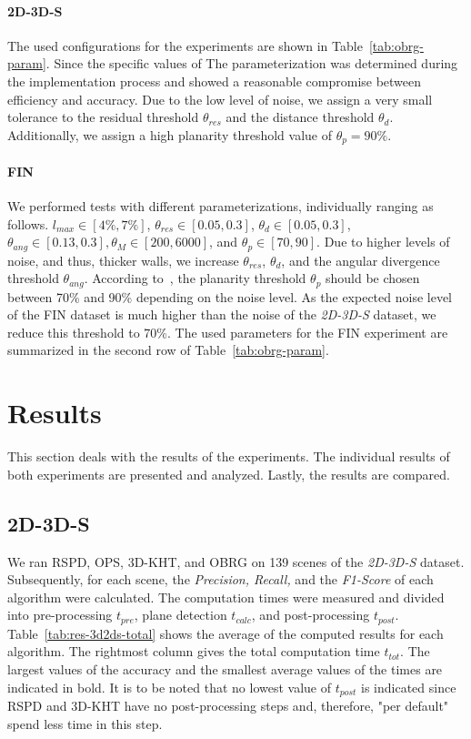 \documentclass[main.tex]{subfiles}
\begin{document}
\paragraph{2D-3D-S}
The used configurations for the experiments are shown in Table~\ref{tab:obrg-param}.
Since the specific values of 
The parameterization was determined during the implementation process and showed a reasonable compromise between
efficiency and accuracy.
Due to the low level of noise, we assign a very small tolerance to the residual threshold $\theta_{res}$ and the distance threshold $\theta_d$.
Additionally, we assign a high planarity threshold value of $\theta_p = 90\%$.

\paragraph{FIN}
We performed tests with different parameterizations, individually ranging as follows.
$l_{max} \in [4\%, 7\%]$, $\theta_{res} \in [0.05, 0.3]$, $\theta_d \in [0.05, 0.3]$, $\theta_{ang}\in[0.13, 0.3], \theta_M \in [200, 6000]$,
and $\theta_p\in[70, 90]$.
Due to higher levels of noise, and thus, thicker walls, we increase $\theta_{res}$, $\theta_d$, and the angular divergence threshold $\theta_{ang}$.
According to~\cite[Section~3.4]{Vo_Truong-Hong_Laefer_Bertolotto_2015},
the planarity threshold $\theta_p$ should be chosen between 70\% and 90\% depending on the noise level. As the expected noise level of the
FIN dataset is much higher than the noise of the \textit{2D-3D-S} dataset, we reduce this threshold to 70\%.
The used parameters for the FIN experiment are summarized in the second row of Table~\ref{tab:obrg-param}.


\section{Results}
This section deals with the results of the experiments.
The individual results of both experiments are presented and analyzed. Lastly, the results are compared.


\subsection{2D-3D-S}

We ran RSPD, OPS, 3D-KHT, and OBRG on 139 scenes of the \textit{2D-3D-S} dataset. Subsequently, for each scene, the \textit{Precision, Recall,} and
the \textit{F1-Score} of each algorithm were calculated. The computation times were measured and divided into pre-processing $t_{pre}$, plane detection $t_{calc}$,
and post-processing $t_{post}$. Table~\ref{tab:res-3d2ds-total} shows the average of the computed results for each algorithm.
The rightmost column gives the total computation time $t_{tot}$. The largest values of the accuracy and the smallest average
values of the times are indicated in bold. It is to be noted that no lowest value of $t_{post}$ is indicated since RSPD and 3D-KHT
have no post-processing steps and, therefore, "per default" spend less time in this step.
\end{document}
